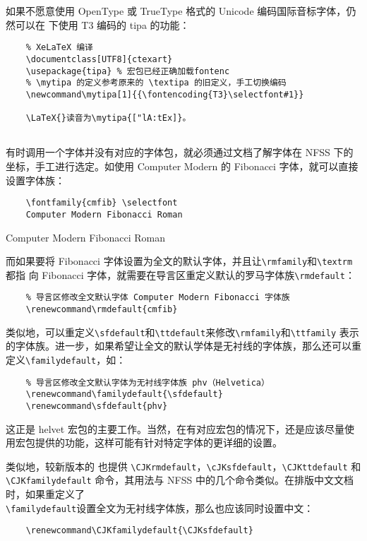 如果不愿意使用 OpenType 或 TrueType 格式的 Unicode 编码国际音标字体，仍然可以在 \XeTeX 下使用 T3 编码的 tipa 的功能：

\begin{lstlisting}
    % XeLaTeX 编译
    \documentclass[UTF8]{ctexart}
    \usepackage{tipa} % 宏包已经正确加载fontenc
    % \mytipa 的定义参考原来的 \textipa 的旧定义，手工切换编码
    \newcommand\mytipa[1]{{\fontencoding{T3}\selectfont#1}}
    
    \LaTeX{}读音为\mytipa{["lA:tEx]}。
    
\end{lstlisting}

有时调用一个字体并没有对应的字体包，就必须通过文档了解字体在 NFSS 下的坐标，手工进行选定。如使用 Computer Modern 的 Fibonacci 字体，就可以直接设置字体族：

\begin{minipage}[t]{0.45\textwidth}
\begin{lstlisting}
    \fontfamily{cmfib} \selectfont
    Computer Modern Fibonacci Roman
\end{lstlisting}
\end{minipage}
\hfill
\begin{minipage}[t]{0.45\textwidth}
     \selectfont
    Computer Modern Fibonacci Roman
\end{minipage}

而如果要将 Fibonacci 字体设置为全文的默认字体，并且让\verb|\rmfamily|和\verb|\textrm|都指
向 Fibonacci 字体，就需要在导言区重定义默认的罗马字体族\verb|\rmdefault|：

\begin{lstlisting}
    % 导言区修改全文默认字体 Computer Modern Fibonacci 字体族
    \renewcommand\rmdefault{cmfib}
\end{lstlisting}

类似地，可以重定义\verb|\sfdefault|和\verb|\ttdefault|来修改\verb|\rmfamily|和\verb|\ttfamily| 表示的字体族。进一步，如果希望让全文的默认学体是无衬线的字体族，那么还可以重定义\verb|\familydefault|，如：
\begin{lstlisting}
    % 导言区修改全文默认字体为无衬线字体族 phv（Helvetica）
    \renewcommand\familydefault{\sfdefault}
    \renewcommand\sfdefault{phv}
\end{lstlisting}

这正是 helvet 宏包的主要工作。当然，在有对应宏包的情况下，还是应该尽量使用宏包提供的功能，这样可能有针对特定字体的更详细的设置。

类似地，较新版本的 \XeTeX 也提供 \verb|\CJKrmdefault|，\verb|\cJKsfdefault|，\verb|\CJKttdefault| 和\\ \verb|\CJKfamilydefault| 命令，其用法与 NFSS 中的几个命令类似。在排版中文文档时，如果重定义了\\\verb|\familydefault|设置全文为无衬线字体族，那么也应该同时设置中文：
\begin{lstlisting}
    \renewcommand\CJKfamilydefault{\CJKsfdefault}
\end{lstlisting}

